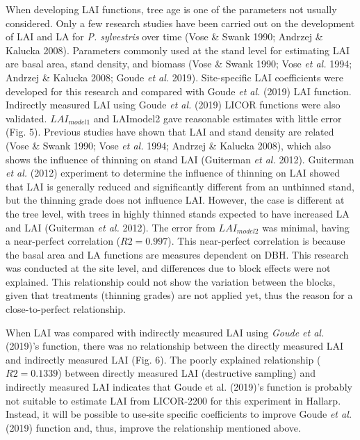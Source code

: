 \documentclass[11pt, a4paper]{report}
\begin{document}
When developing LAI functions, tree age is one of the parameters not usually considered. Only a few research studies have been carried out on the development of LAI and LA for \textit{P. sylvestris} over time (Vose \& Swank 1990; Andrzej \& Kalucka 2008). Parameters commonly used at the stand level for estimating LAI are basal area, stand density, and biomass (Vose \& Swank 1990; Vose \textit{et al.} 1994; Andrzej \& Kalucka 2008; Goude \textit{et al.} 2019). Site-specific LAI coefficients were developed for this research and compared with Goude \textit{et al.} (2019) LAI function. Indirectly measured LAI using Goude \textit{et al.} (2019) LICOR functions were also validated. $LAI_{model1}$ and LAImodel2 gave reasonable estimates with little error (Fig. 5). Previous studies have shown that LAI and stand density are related (Vose \& Swank 1990; Vose \textit{et al.} 1994; Andrzej \& Kalucka 2008), which also shows the influence of thinning on stand LAI (Guiterman \textit{et al.} 2012). Guiterman \textit{et al.} (2012) experiment to determine the influence of thinning on LAI showed that LAI is generally reduced and significantly different from an unthinned stand, but the thinning grade does not influence LAI. However, the case is different at the tree level, with trees in highly thinned stands expected to have increased LA and LAI (Guiterman \textit{et al.} 2012).
The error from $LAI_{model2}$ was minimal, having a near-perfect correlation ($R2 =
0.997$). This near-perfect correlation is because the basal area and LA functions are
measures dependent on DBH. This research was conducted at the site level, and
differences due to block effects were not explained. This relationship could not show the variation between the blocks, given that treatments (thinning grades) are not applied yet, thus the reason for a close-to-perfect relationship. 

When LAI was compared with indirectly measured LAI using \textit{Goude et al.} (2019)’s function, there was no relationship between the directly measured LAI and indirectly measured LAI (Fig. 6). The poorly explained relationship ($R2 = 0.1339$) between directly measured LAI (destructive sampling) and indirectly measured LAI indicates that Goude et al. (2019)'s function is probably not suitable to estimate LAI from LICOR-2200 for this experiment in Hallarp. Instead, it will be possible to use-site specific coefficients to improve Goude \textit{et al.} (2019) function and, thus, improve the relationship mentioned above.
\end{document}
